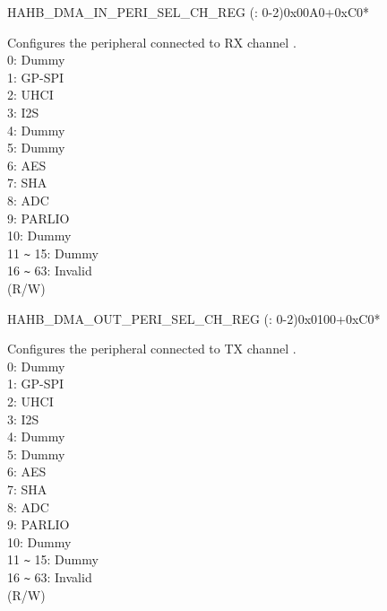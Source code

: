 \begin{register}{H}{AHB\_DMA\_IN\_PERI\_SEL\_CH\_REG (: 0-2)}{0x00A0+0xC0*}\label{regdesc:AHBDMAINPERISELCHNREG}
%
%
\regnewline%
\begin{regdesc}\begin{reglist}
\label{fielddesc:AHBDMAPERIINSELCHN}\item [AHB\_DMA\_PERI\_IN\_SEL\_CH\regindex{n}] Configures the peripheral connected to RX channel .\\
0: Dummy\\ 1: GP-SPI\\ 2: UHCI\\ 3: I2S\\ 4: Dummy\\ 5: Dummy\\ 6: AES\\ 7: SHA\\ 8: ADC\\ 9: PARLIO\\ 10: Dummy\\ 11 \verb+~+ 15: Dummy\\
16 \verb+~+ 63: Invalid\\ (R/W)
\end{reglist}\end{regdesc}
\end{register}


\begin{register}{H}{AHB\_DMA\_OUT\_PERI\_SEL\_CH\_REG (: 0-2)}{0x0100+0xC0*}\label{regdesc:AHBDMAOUTPERISELCHNREG}
%
%
\regnewline%
\begin{regdesc}\begin{reglist}
\label{fielddesc:AHBDMAPERIOUTSELCHN}\item [AHB\_DMA\_PERI\_OUT\_SEL\_CH\regindex{n}] Configures the peripheral connected to TX channel .\\
0: Dummy\\ 1: GP-SPI\\ 2: UHCI\\ 3: I2S\\ 4: Dummy\\ 5: Dummy\\ 6: AES\\ 7: SHA\\ 8: ADC\\ 9: PARLIO\\ 10: Dummy\\ 11 \verb+~+ 15: Dummy\\
16  \verb+~+  63: Invalid\\ (R/W)
\end{reglist}\end{regdesc}
\end{register}


